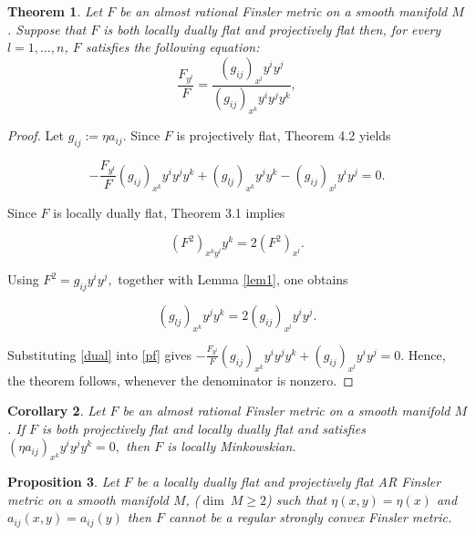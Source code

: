 \documentclass[12pt]{article}
\newtheorem{theorem}{Theorem}[section]
\newtheorem{proposition}[theorem]{Proposition}
\newtheorem{corollary}[theorem]{Corollary}
\theoremstyle{definition}
\begin{document}
												\begin{theorem}
													Let $F$ be an almost rational Finsler metric on a smooth manifold $M$. Suppose that $F$ is both locally dually flat and projectively flat then, for every $l=1,\ldots,n$, $F$ satisfies the following equation:
													\begin{equation}\label{ratio}
													\frac{F_{y^l}}{F}
													=\frac{(g_{ij})_{x^l}y^iy^j}
													{(g_{ij})_{x^k}y^iy^jy^k},
													\end{equation}
												\end{theorem}
												\begin{proof}
													Let $g_{ij}:=\eta a_{ij}.$ Since $F$ is projectively flat, Theorem 4.2 yields
													
													\begin{equation}\label{pf}
													-\frac{F_{y^l}}{F}
													(g_{ij})_{x^k}y^iy^jy^k
													+
													(g_{lj})_{x^k}y^jy^k
													-(g_{ij})_{x^l}y^iy^j= 0.
													\end{equation}
													
													Since $F$ is locally dually flat, Theorem 3.1 implies 
													
													\begin{equation}
													(F^2)_{x^ky^l}y^k
													=2(F^2)_{x^l}.    
													\end{equation}
													
													
													Using $F^2=g_{ij}y^iy^j,$ together with Lemma \ref{lem1}, one obtains
													
													\begin{equation}\label{dual}
													(g_{lj})_{x^k}y^jy^k
													=2(g_{ij})_{x^l}y^iy^j.
													\end{equation}
													
													Substituting \eqref{dual} into \eqref{pf} gives $-\frac{F_{y^l}}{F}
													(g_{ij})_{x^k}y^iy^jy^k
													+
													(g_{ij})_{x^l}y^iy^j
													=0.$
													Hence, the theorem follows, whenever the denominator is nonzero.
												\end{proof}
												
												\begin{corollary}
													Let $F$ be an almost rational Finsler metric on a smooth manifold $M$. If $F$ is both projectively flat and locally dually flat and satisfies $(\eta a_{ij})_{x^k}y^iy^jy^k=0,$ then $F$ is locally Minkowskian.
												\end{corollary}
												\begin{proposition}
													Let $F$ be a locally dually flat and projectively flat AR Finsler metric on a smooth manifold $M$, ($\dim~M\ge 2$) such that $\eta(x,y)=\eta(x)$ and $a_{ij}(x,y)=a_{ij}(y)$ then $F$ cannot be a regular strongly convex Finsler metric.
												\end{proposition}
												
\end{document}
